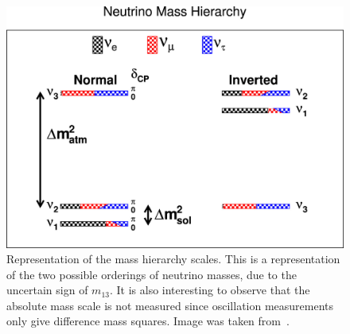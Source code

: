 \begin{figure}[]
\centering
\includegraphics[width=\textwidth]{images/mass_hierarchy.jpg}
\caption{Representation of the mass hierarchy scales. This is a representation of the two possible orderings of neutrino masses, due to the uncertain sign of $m_{13}$. It is also interesting to observe that the absolute mass scale is not measured since oscillation measurements only give difference mass squares. Image was taken from~\citep{QIAN20151}.}
\label{fig:mass_hierarchy}
\end{figure}

